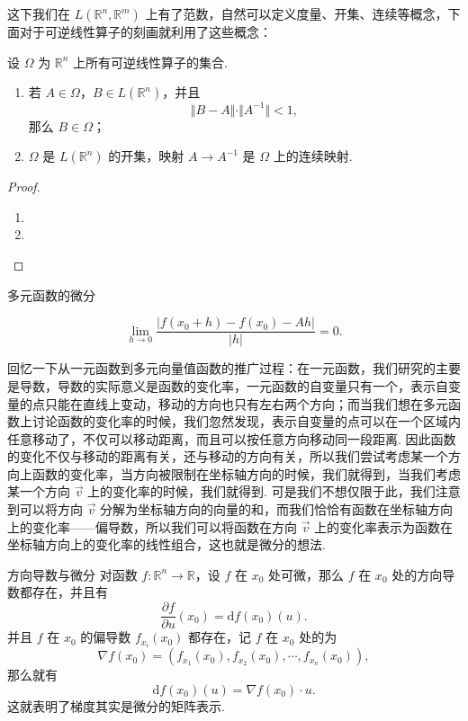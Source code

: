 这下我们在 $L(\mathbb{R}^n, \mathbb{R}^m)$ 上有了范数，自然可以定义度量、开集、连续等概念，下面对于可逆线性算子的刻画就利用了这些概念：

\begin{theorem}{}{}
    设 $\Omega$ 为 $\mathbb{R}^n$ 上所有可逆线性算子的集合.
    \begin{enumerate}
        \item 若 $A\in \Omega$，$B\in L(\mathbb{R}^n)$，并且 \[\Vert B-A\Vert\cdot\Vert A^{-1}\Vert < 1,\]那么 $B\in \Omega$；
        \item $\Omega$ 是 $L(\mathbb{R}^n)$ 的开集，映射 $A\to A^{-1}$ 是 $\Omega$ 上的连续映射.
    \end{enumerate}
\end{theorem}

\begin{proof}
    \begin{enumerate}
        \item
        \item
    \end{enumerate}
\end{proof}

\begin{definition}{多元函数的微分}{}

\[\lim\limits_{h\to 0}\frac{\vert f(x_0 + h) - f(x_0) - Ah \vert}{\vert h \vert} = 0.\]

\end{definition}


回忆一下从一元函数到多元向量值函数的推广过程：在一元函数，我们研究的主要是导数，导数的实际意义是函数的变化率，一元函数的自变量只有一个，表示自变量的点只能在直线上变动，移动的方向也只有左右两个方向；而当我们想在多元函数上讨论函数的变化率的时候，我们忽然发现，表示自变量的点可以在一个区域内任意移动了，不仅可以移动距离，而且可以按任意方向移动同一段距离. 因此函数的变化不仅与移动的距离有关，还与移动的方向有关，所以我们尝试考虑某一个方向上函数的变化率，当方向被限制在坐标轴方向的时候，我们就得到，当我们考虑某一个方向 $\vec{v}$ 上的变化率的时候，我们就得到. 可是我们不想仅限于此，我们注意到可以将方向 $\vec{v}$ 分解为坐标轴方向的向量的和，而我们恰恰有函数在坐标轴方向上的变化率——偏导数，所以我们可以将函数在方向 $\vec{v}$ 上的变化率表示为函数在坐标轴方向上的变化率的线性组合，这也就是微分的想法.

\begin{theorem}{方向导数与微分}{}
    对函数 $f: \mathbb{R}^n\to \mathbb{R}$，设 $f$ 在 $x_0$ 处可微，那么 $f$ 在 $x_0$ 处的方向导数都存在，并且有\[\frac{\partial f}{\partial u}(x_0) = \mathrm{d}f(x_0)(u).\]
    并且 $f$ 在 $x_0$ 的偏导数 $f_{x_i}(x_0)$ 都存在，记 $f$ 在 $x_0$ 处的为 \[\nabla f(x_0) = (f_{x_1}(x_0), f_{x_2}(x_0), \cdots, f_{x_n}(x_0)),\]
    那么就有 \[\mathrm{d}f(x_0)(u) = \nabla f(x_0)\cdot u.\]这就表明了\textrm{梯度其实是微分的矩阵表示}.
\end{theorem}

